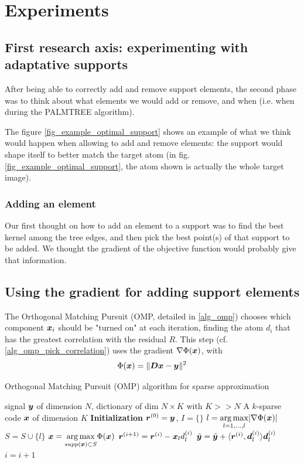 \chapter{Experiments}

\section{First research axis: experimenting with adaptative supports}

After being able to correctly add and remove support elements, the second phase was to think about what elements we would add or remove, and when (i.e. when during the PALMTREE algorithm).

The figure \ref{fig_example_optimal_support} shows an example of what we think would happen when allowing to add and remove elements: the support would shape itself to better match the target atom (in fig.\ref{fig_example_optimal_support}, the atom shown is actually the whole target image).


\subsection{Adding an element}
Our first thought on how to add an element to a support was to find the best kernel among the tree edges, and then pick the best point(s) of that support to be added. We thought the gradient of the objective function would probably give that information. 







\section{Using the gradient for adding support elements}

The Orthogonal Matching Pursuit (OMP, detailed in \cref{alg_omp}) chooses which component $\bm x_i$ should be "turned on" at each iteration, finding the atom $d_i$ that has the greatest correlation with the residual $R$. This step (cf. \cref{alg_omp_pick_correlation}) uses the gradient $\nabla \Phi(\bm x)$, with $$\Phi(\bm x) = \lVert \bm D\bm x - \bm y \rVert^2$$


\begin{algorithm}[!ht]
    \caption{Orthogonal Matching Pursuit (OMP) algorithm for sparse approximation}\label{alg_omp}
  \begin{algorithmic}[0]
    \Input signal $\bm y$ of dimension $N$, dictionary of dim $N \times K$ with $K>>N$
    \Output A $k$-sparse code $\bm x$ of dimension $K$
    \State \textbf{Initialization} $\bm{r}^{(0)} = \bm y$, $I=\{\}$
      \State $l =  \underset{l = 1,\dots,l}{\arg\max} | \nabla \Phi(\bm x) |$ \label{alg_omp_pick_correlation}
      \State $S = S \cup \{l\}$
      \State $\bm x = \underset{supp(\bm x) \subset S}{\arg\max} \Phi(\bm x)$
      \State $\bm{r}^{(i+1)} = \bm{r}^{(i)}-\bm x_l d_l^{(i)}$
      \State $\hat{\bm y} = \hat{\bm y}+\langle \bm{r}^{(i)}, \bm d_{l}^{(i)} \rangle \bm d_{l}^{(i)}$
      \State $i = i + 1$
    \EndWhile
  \end{algorithmic}
\end{algorithm}

